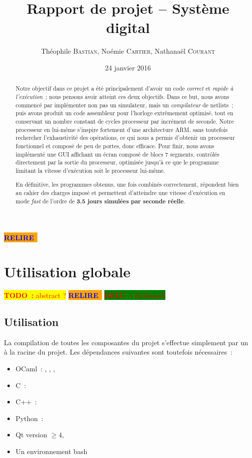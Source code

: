 \documentclass[11pt,a4paper]{article}
\author{Théophile \textsc{Bastian}, Noémie \textsc{Cartier}, Nathanaël \textsc{Courant}}
\title{Rapport de projet -- Système digital}
\date{24 janvier 2016} %
\newcommand{\todo}[1]{\colorbox{yellow}{\textcolor{red}{\textbf{TODO~:} #1}}}
\newcommand{\relire}{\colorbox{orange}{\textcolor{blue}{\textbf{RELIRE}~}}}
\newcommand{\relu}[1]{\colorbox{green}{\textcolor{red}{\textbf{RELU~:} #1}}}
\begin{document}
\maketitle

\relire
\begin{abstract}
Notre objectif dans ce projet a été principalement d'avoir un code \emph{correct} et \emph{rapide à l'exécution}~; nous pensons avoir atteint ces deux objectifs. Dans ce but, nous avons commencé par implémenter non pas un simulateur, mais un \emph{compilateur} de netlists~; puis avons produit un code assembleur pour l'horloge extrêmement optimisé, tout en conservant un nombre constant de cycles processeur par incrément de seconde. Notre processeur en lui-même s'inspire fortement d'une architecture ARM, sans toutefois rechercher l'exhaustivité des opérations, ce qui nous a permis d'obtenir un processeur fonctionnel et composé de peu de portes, donc efficace. Pour finir, nous avons implémenté une GUI affichant un écran composé de blocs 7 segments, contrôlés directement par la sortie du processeur, optimisée jusqu'à ce que le programme limitant la vitesse d'exécution soit le processeur lui-même.

En définitive, les programmes obtenus, une fois combinés correctement, répondent bien au cahier des charges imposé et permettent d'atteindre une vitesse d'exécution en mode \textit{fast} de l'ordre de \textbf{3.5 jours simulées par seconde réelle}.
\end{abstract}

\setcounter{tocdepth}{2} %
\tableofcontents
\pagebreak


\section{Utilisation globale}

\todo{abstract ?}
\relire
\relu{Nathanaël}

\subsection{Utilisation}

La compilation de toutes les composantes du projet s'effectue simplement par un  à la racine du projet. Les dépendances suivantes sont toutefois nécessaires~:

\begin{itemize}
\item OCaml~: , , , 
\item C~: 
\item C++~: 
\item Python~: 
\item Qt version $\geq 4$, 
\item Un environnement bash
\end{itemize}
\end{document}
